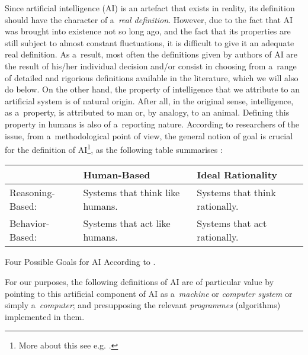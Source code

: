 Since artificial intelligence (AI) is an artefact that exists in reality, its definition should have the character of a~\textit{real definition}. However, due to the fact that AI was brought into existence not so long ago, and the fact that its properties are still subject to almost constant fluctuations, it is difficult to give it an adequate real definition. As a~result, most often the definitions given by authors of AI are the result of his/her individual decision and/or consist in choosing from a~range of detailed and rigorious definitions available in the literature, which we will also do below. On the other hand, the property of intelligence that we attribute to an artificial system is of natural origin. After all, in the original sense, intelligence, as a~property, is attributed to man or, by analogy, to an animal. Defining this property in humans is also of a~reporting nature. According to researchers of the issue, from a~methodological point of view, the general notion of goal is crucial for the definition of AI\footnote{ More about this see e.g.
\parencite[][]{}.%
}, as the following table summarises 
\parencites[][]{bringsjord_artificial_2022}[cf.][]{russell_artificial_2021}:%


\begin{flushleft}




\begin{supertabular}{|m{3.4459999cm}|m{5.892cm}|m{5.453cm}|}
\hline
&
Human-Based &
Ideal Rationality\\\hline
Reasoning-Based: &
Systems that think like humans. &
Systems that think rationally.\\\hline
Behavior-Based: &
Systems that act like humans. &
Systems that act rationally.\\\hline
\end{supertabular}
\end{flushleft}
Four Possible Goals for AI According to
\parencite[][]{russell_artificial_2021}.%


For our purposes, the following definitions of AI are of particular value by pointing to this artificial component of AI as a~\textit{machine} or \textit{computer system} or simply a~\textit{computer}; and presupposing the relevant \textit{programmes} (algorithms) implemented in them.

